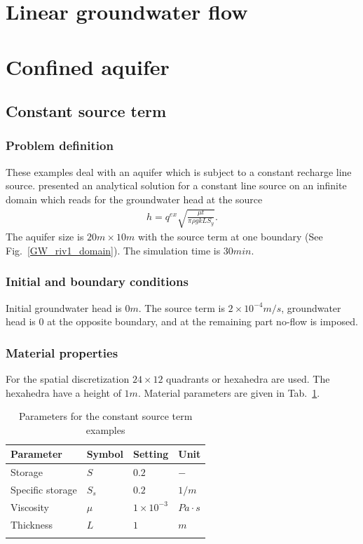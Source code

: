 \section{Linear groundwater flow}

%
\section{Confined aquifer}
\label{sec:Groundwater_confined}
%
\subsection{Constant source term}
\label{sec:Groundwater_confined_source}
%
\subsubsection*{Problem definition}
%
These examples deal with an aquifer which is subject to a constant recharge line source.
\cite{Glover:78} presented an analytical solution for a constant line source on an infinite domain which reads for the groundwater head at the source
%
\begin{eqnarray}
h = q^{ex}\sqrt{ \frac{\mu t}{\pi \rho g k L S_y}}. \label{GW_Glover}
\end{eqnarray}
%
The aquifer size is $20m\times 10m$ with the source term at one boundary (See Fig.~\ref{GW_riv1_domain}). The simulation time is $30min$.
%
\subsubsection*{Initial and boundary conditions}
%
Initial groundwater head is $0m$. The source term is $2\times 10^{-4} m/s$, groundwater head is $0$ at the opposite boundary, and at the remaining part no-flow is imposed.
\subsubsection*{Material properties}
%
For the spatial discretization $24\times 12$ quadrants or hexahedra are used. The hexahedra have a height of $1m$.
Material parameters are given in Tab.~\ref{GW_SourceTerm}.
%
\begin{table}[H]
 \centering
 \caption{Parameters for the constant source term examples}
 \centering \label{GW_SourceTerm}
 \begin{tabular}{llll}
 \hline\hline\noalign{\smallskip}
 {\bf Parameter} & {\bf Symbol} & {\bf Setting} & {\bf Unit} \\ \hline
 Storage & $S$ & $0.2$ & $-$ \\
 Specific storage & $S_s$ & $0.2$ & $1/m$ \\
 Viscosity  & $\mu$ & $1\times 10^{-3}$ & $Pa\cdot s$\\
 Thickness & $L$ & $1$ & $m$ \\
 \noalign{\smallskip}\hline\hline
 \end{tabular}
\end{table}
%
